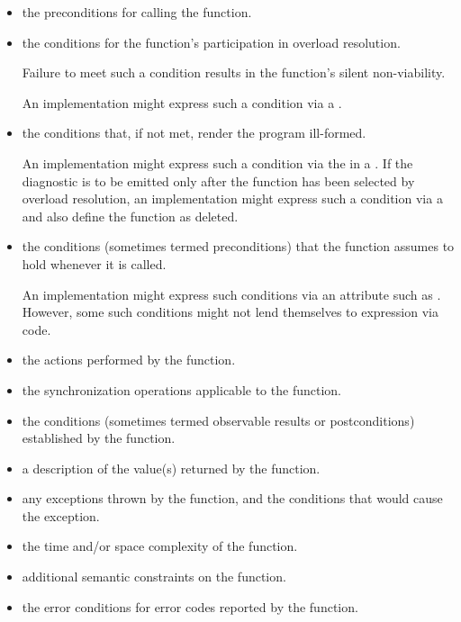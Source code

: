 \begin{itemize}
\item
\requires the preconditions for calling the function.

\item
\constraints the conditions for the function's participation
in overload resolution.
\begin{note}
Failure to meet such a condition results in the function's silent non-viability.
\end{note}
\begin{example}
An implementation might express such a condition
via a .
\end{example}

\item
\mandates the conditions that, if not met, render the program ill-formed.
\begin{example}
An implementation might express such a condition
via the 
in a .
If the diagnostic is to be emitted only after the function
has been selected by overload resolution,
an implementation might express such a condition
via a 
and also define the function as deleted.
\end{example}

\item
\expects the conditions (sometimes termed preconditions)
that the function assumes to hold whenever it is called.
\begin{example}
An implementation might express such conditions
via an attribute such as \tcode{[[expects]]}.
However, some such conditions might not lend themselves
to expression via code.
\end{example}

\item
\effects the actions performed by the function.

\item
\sync the synchronization operations applicable to the function.

\item
\ensures the conditions (sometimes termed observable results or postconditions)
established by the function.

\item
\returns a description of the value(s) returned by the function.

\item
\throws any exceptions thrown by the function, and the conditions that would cause the exception.

\item
\complexity the time and/or space complexity of the function.

\item
\remarks additional semantic constraints on the function.

\item
\errors the error conditions for error codes reported by the function.
\end{itemize}

